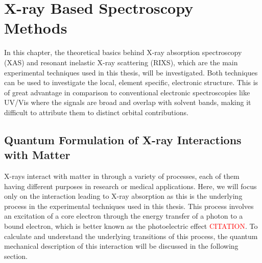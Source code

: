 \chapter{X-ray Based Spectroscopy Methods}
\label{chapter:X-ray_Based_Spectroscopy_Methods}
In this chapter, the theoretical basics behind X-ray absorption spectroscopy (XAS) and resonant inelastic X-ray scattering (RIXS), which are the main experimental techniques used in this thesis, will be investigated. Both techniques can be used to investigate the local, element specific, electronic structure. This is of great advantage in comparison to conventional electronic spectroscopies like UV/Vis where the signals are broad and overlap with solvent bands, making it difficult to attribute them to distinct orbital contributions.
\section{Quantum Formulation of X-ray Interactions with Matter}
\label{sec:X-ray_Interaction_with_Matter}
X-rays interact with matter in through a variety of processes, each of them having different purposes in research or medical applications. Here, we will focus only on the interaction leading to X-ray absorption as this is the underlying process in the experimental techniques used in this thesis. This process involves an excitation of a core electron through the energy transfer of a photon to a bound electron, which is better known as the photoelectric effect \textcolor{red}{CITATION}. To calculate and understand the underlying transitions of this process, the quantum mechanical description of this interaction will be discussed in the following section.
